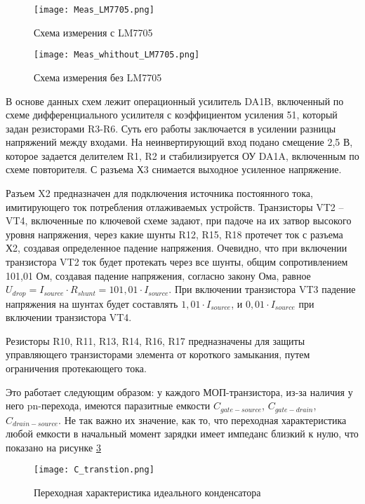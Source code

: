\begin{figure}[H]
\centering
\texttt{[image: Meas\_LM7705.png]}
\caption{Схема измерения с LM7705}
\label{ris:428}
\end{figure}


\begin{figure}[H]
\centering
\texttt{[image: Meas\_whithout\_LM7705.png]}
\caption{Схема измерения без LM7705}
\label{ris:429}
\end{figure}

В основе данных схем лежит операционный усилитель DA1B, включенный по схеме дифференциального усилителя с 
коэффициентом усиления 51, который задан резисторами R3-R6. Суть его работы заключается в усилении разницы 
напряжений между входами. На неинвертирующий вход подано смещение 2,5 В, которое задается делителем R1, R2 и 
стабилизируется ОУ DA1A, включенным по схеме повторителя. С разъема Х3 снимается выходное усиленное напряжение. 

Разъем X2 предназначен для подключения источника постоянного тока, имитирующего ток потребления отлаживаемых устройств. 
Транзисторы VT2 -- VT4, включенные по ключевой схеме задают, при падоче на их затвор высокого уровня напряжения,
через какие шунты R12, R15, R18 протечет ток с разъема Х2, создавая определенное падение напряжения. 
Очевидно, что при включении транзистора VT2 ток будет протекать через
все шунты, общим сопротивлением 101,01 Ом, создавая падение напряжения, согласно закону Ома, равное 
$U_{drop} = I_{source} \cdot R_{shunt} = 101,01 \cdot I_{source}$. При включении транзистора VT3 падение напряжения
на шунтах будет составлять $1,01 \cdot I_{source}$, и $0,01 \cdot I_{source}$ при включении транзистора VT4. 

Резисторы R10, R11, R13, R14, R16, R17 предназначены для защиты управляющего транзисторами элемента от короткого
замыкания, путем ограничения протекающего тока. 

Это работает следующим образом: у каждого МОП-транзистора, из-за наличия у него pn-перехода, имеются
паразитные емкости $C_{gate-source}$, $C_{gate-drain}$, $C_{drain-source}$. Не так важно их значение, как то, что
переходная характеристика любой емкости в начальный момент зарядки имеет импеданс близкий к нулю, что 
показано на рисунке \ref{ris:430}

\begin{figure}[H]
\centering
\texttt{[image: C\_transtion.png]}
\caption{Переходная характеристика идеального конденсатора}
\label{ris:430}
\end{figure}

